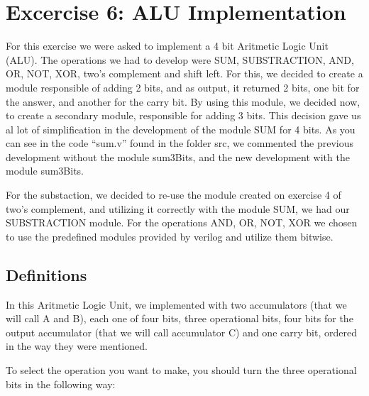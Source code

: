 

\section{\color{olive}Excercise 6: ALU Implementation}

For this exercise we were asked to implement a 4 bit Aritmetic Logic
Unit (ALU). The operations we had to develop were SUM, SUBSTRACTION,
AND, OR, NOT, XOR, two's complement and shift left. For this, we decided
to create a module responsible of adding 2 bits, and as output, it
returned 2 bits, one bit for the answer, and another for the carry
bit. By using this module, we decided now, to create a secondary module,
responsible for adding 3 bits. This decision gave us al lot of simplification
in the development of the module SUM for 4 bits. As you can see in
the code ``sum.v'' found in the folder src, we commented the previous
development without the module sum3Bits, and the new development with
the module sum3Bits.

For the substaction, we decided to re-use the module created on exercise
4 of two's complement, and utilizing it correctly with the module
SUM, we had our SUBSTRACTION module. For the operations AND, OR, NOT,
XOR we chosen to use the predefined modules provided by verilog and
utilize them bitwise.

\subsection{\color{purple}Definitions}

In this Aritmetic Logic Unit, we implemented with two accumulators
(that we will call A and B), each one of four bits, three operational
bits, four bits for the output accumulator (that we will call accumulator
C) and one carry bit, ordered in the way they were mentioned.

To select the operation you want to make, you should turn the three
operational bits in the following way:

